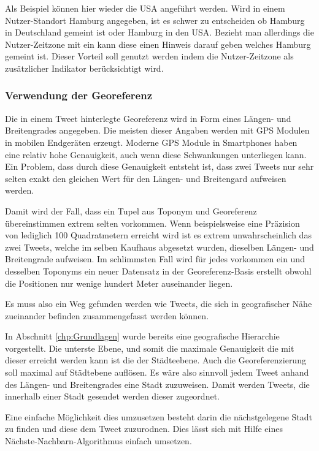 						Als Beispiel können hier wieder die USA angeführt werden. 
						Wird in einem Nutzer-Standort Hamburg angegeben, ist es schwer zu entscheiden ob Hamburg in Deutschland gemeint ist oder Hamburg in den USA. 
						Bezieht man allerdings die Nutzer-Zeitzone mit ein kann diese einen Hinweis darauf geben welches Hamburg gemeint ist.
						Dieser Vorteil soll genutzt werden indem die Nutzer-Zeitzone als zusätzlicher Indikator berücksichtigt wird.  

					\subsubsection{Verwendung der Georeferenz}  
						Die in einem Tweet hinterlegte Georeferenz wird in Form eines Längen- und Breitengrades angegeben.
						Die meisten dieser Angaben werden mit GPS Modulen in mobilen Endgeräten erzeugt. 
						Moderne GPS Module in Smartphones haben eine relativ hohe Genauigkeit, auch wenn diese Schwankungen unterliegen kann.
						Ein Problem, dass durch diese Genauigkeit entsteht ist, dass zwei Tweets nur sehr selten exakt den gleichen Wert für den Längen- und Breitengard aufweisen werden.

						Damit wird der Fall, dass ein Tupel aus Toponym und Georeferenz übereinstimmen extrem selten vorkommen.
						Wenn beispielsweise eine Präzision von lediglich 100 Quadratmetern erreicht wird ist es extrem unwahrscheinlich das zwei Tweets, welche im selben Kaufhaus abgesetzt wurden, dieselben Längen- und Breitengrade aufweisen.
						Im schlimmsten Fall wird für jedes vorkommen ein und desselben Toponyms ein neuer Datensatz in der Georeferenz-Basis erstellt obwohl die Positionen nur wenige hundert Meter auseinander liegen.

						Es muss also ein Weg gefunden werden wie Tweets, die sich in geografischer Nähe zueinander befinden zusammengefasst werden können.

						In Abschnitt \ref{chp:Grundlagen} wurde bereits eine geografische Hierarchie vorgestellt.
						Die unterste Ebene, und somit die maximale Genauigkeit die mit dieser erreicht werden kann ist die der Städteebene.
						Auch die Georeferenzierung soll maximal auf Städtebene auflösen.
						Es wäre also sinnvoll jedem Tweet anhand des Längen- und Breitengrades eine Stadt zuzuweisen.
						Damit werden Tweets, die innerhalb einer Stadt gesendet werden dieser zugeordnet.
						
						Eine einfache Möglichkeit dies umzusetzen besteht darin die nächstgelegene Stadt zu finden und diese dem Tweet zuzurodnen.
						Dies lässt sich mit Hilfe eines Nächste-Nachbarn-Algorithmus einfach umsetzen.


